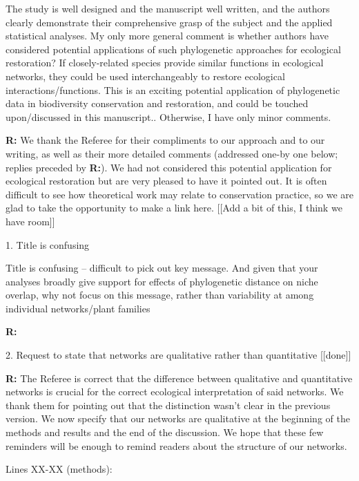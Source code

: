\documentclass[12pt]{letter}
\newenvironment{refquote}{\bigskip \begin{it}}{\end{it}\smallskip}
\begin{document}
	\begin{refquote}
		The study is well designed and the manuscript well written, and the authors clearly demonstrate their comprehensive grasp of the subject and the applied statistical analyses.
		My only more general comment is whether authors have considered potential applications of such phylogenetic approaches for ecological restoration? If closely-related species provide similar functions in ecological networks, they could be used interchangeably to restore ecological interactions/functions. This is an exciting potential application of phylogenetic data in biodiversity conservation and restoration, and could be touched upon/discussed in this manuscript.. 
		Otherwise, I have only minor comments.
	\end{refquote}

	\textbf{R:} We thank the Referee for their compliments to our approach and to our writing, as well as their more detailed comments (addressed one-by one below; replies preceded by \textbf{R:}). We had not considered this potential application for ecological restoration but are very pleased to have it pointed out. It is often difficult to see how theoretical work may relate to conservation practice, so we are glad to take the opportunity to make a link here. [[Add a bit of this, I think we have room]]

	1. Title is confusing

		\begin{refquote}
			Title is confusing – difficult to pick out key message. And given that your analyses broadly give support for effects of phylogenetic distance on niche overlap, why not focus on this message, rather than variability at among individual networks/plant families
		\end{refquote}


		\textbf{R:} 


	2. Request to state that networks are qualitative rather than quantitative [[done]]

		\textbf{R:} The Referee is correct that the difference between qualitative and quantitative networks is crucial for the correct ecological interpretation of said networks. We thank them for pointing out that the distinction wasn't clear in the previous version. We now specify that our networks are qualitative at the beginning of the methods and results and the end of the discussion. We hope that these few reminders will be enough to remind readers about the structure of our networks.

		Lines XX-XX (methods):
\end{document}
